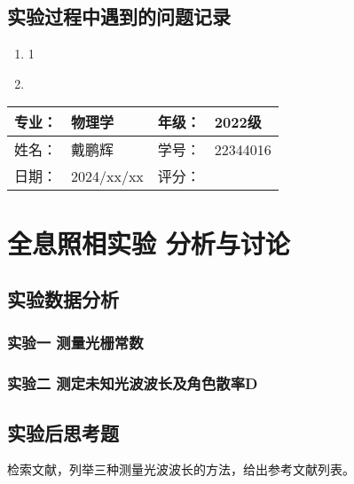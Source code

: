 \documentclass[dvipsnames, svgnames,a4paper,11pt]{article}
\begin{document}



\subsection{实验过程中遇到的问题记录}

	\begin{enumerate}
		\item  1
		\item 
	\end{enumerate}

		

\clearpage
\begin{table}
	\renewcommand\arraystretch{1.7}
	\begin{tabularx}{\textwidth}{|X|X|X|X|}
	\hline

	专业：& 物理学 &年级：& 2022级\\
	\hline
	姓名： & 戴鹏辉 & 学号：& 22344016\\
	\hline
    日期：& 2024/xx/xx & 评分： &\\
	\hline
	\end{tabularx}
\end{table}

\section{全息照相实验 \quad\heiti 分析与讨论}

\subsection{实验数据分析}

	\subsubsection{实验一 测量光栅常数}
	
		
	\subsubsection{实验二 测定未知光波波长及角色散率D}
			

			
\subsection{实验后思考题}



\begin{question}
	检索文献，列举三种测量光波波长的方法，给出参考文献列表。%
\end{question}
	

	
\end{document}

